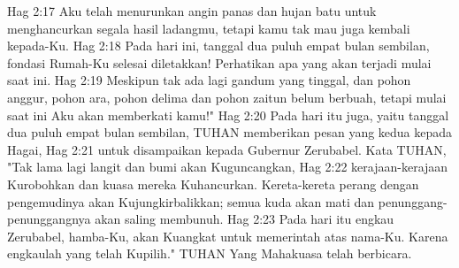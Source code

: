 Hag 2:17  Aku telah menurunkan angin panas dan hujan batu untuk menghancurkan segala hasil ladangmu, tetapi kamu tak mau juga kembali kepada-Ku.
Hag 2:18  Pada hari ini, tanggal dua puluh empat bulan sembilan, fondasi Rumah-Ku selesai diletakkan! Perhatikan apa yang akan terjadi mulai saat ini.
Hag 2:19  Meskipun tak ada lagi gandum yang tinggal, dan pohon anggur, pohon ara, pohon delima dan pohon zaitun belum berbuah, tetapi mulai saat ini Aku akan memberkati kamu!"
Hag 2:20  Pada hari itu juga, yaitu tanggal dua puluh empat bulan sembilan, TUHAN memberikan pesan yang kedua kepada Hagai,
Hag 2:21  untuk disampaikan kepada Gubernur Zerubabel. Kata TUHAN, "Tak lama lagi langit dan bumi akan Kuguncangkan,
Hag 2:22  kerajaan-kerajaan Kurobohkan dan kuasa mereka Kuhancurkan. Kereta-kereta perang dengan pengemudinya akan Kujungkirbalikkan; semua kuda akan mati dan penunggang-penunggangnya akan saling membunuh.
Hag 2:23  Pada hari itu engkau Zerubabel, hamba-Ku, akan Kuangkat untuk memerintah atas nama-Ku. Karena engkaulah yang telah Kupilih." TUHAN Yang Mahakuasa telah berbicara.


